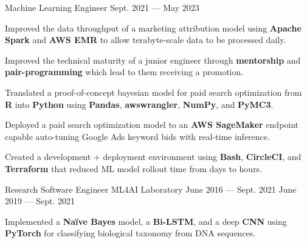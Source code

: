 \begin{cventries}
  \cventry
    {Machine Learning Engineer} %
    {} %
    {} %
    {Sept. 2021 --- May 2023} %
    {
      \vspace{-0.1cm}
      \begin{cvitems} %
        \item Improved the data throughput of a marketing attribution model using \textbf{Apache Spark} and \textbf{AWS EMR} to allow terabyte-scale data to be processed daily.
        \item Improved the technical maturity of a junior engineer through \textbf{mentorship} and \textbf{pair-programming} which lead to them receiving a promotion.
        \item Translated a proof-of-concept bayesian model for paid search optimization from \textbf{R} into \textbf{Python} using \textbf{Pandas}, \textbf{awswrangler}, \textbf{NumPy}, and \textbf{PyMC3}.
        \item Deployed a paid search optimization model to an \textbf{AWS SageMaker} endpoint capable auto-tuning Google Ads keyword bids with real-time inference.
        \item Created a development + deployment environment using \textbf{Bash}, \textbf{CircleCI}, and \textbf{Terraform} that reduced ML model rollout time from days to hours.
      \end{cvitems}
    }
  \vspace{.2cm}
  \cventry
    {Research Software Engineer} %
    {ML4AI Laboratory} %
    {June 2016 --- Sept. 2021} %
    {June 2019 --- Sept. 2021} %
    {
      \vspace{-0.1cm}
      \begin{cvitems} %
        \item Implemented a \textbf{Naïve Bayes} model, a \textbf{Bi-LSTM}, and a deep \textbf{CNN} using \textbf{PyTorch} for classifying biological taxonomy from DNA sequences.

\end{cvitems}}
\end{cventries}
